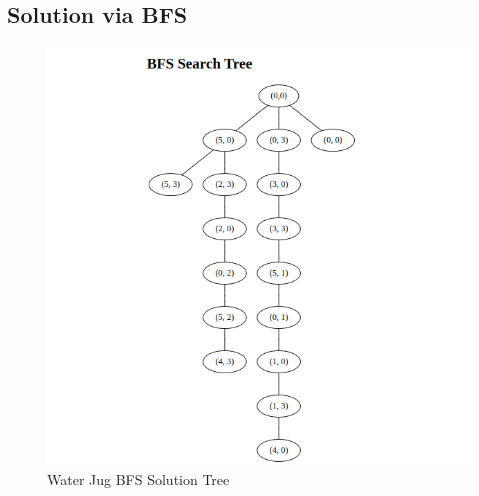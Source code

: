 \documentclass[12pt]{article}
\begin{document}
\subsection{Solution via BFS}
\begin{figure}[h]
  \centerline{\includegraphics[width = 150mm]{WaterJug_BFS.png}}
  \caption{Water Jug BFS Solution Tree}
  \label{fig}
\end{figure}
\end{document}

